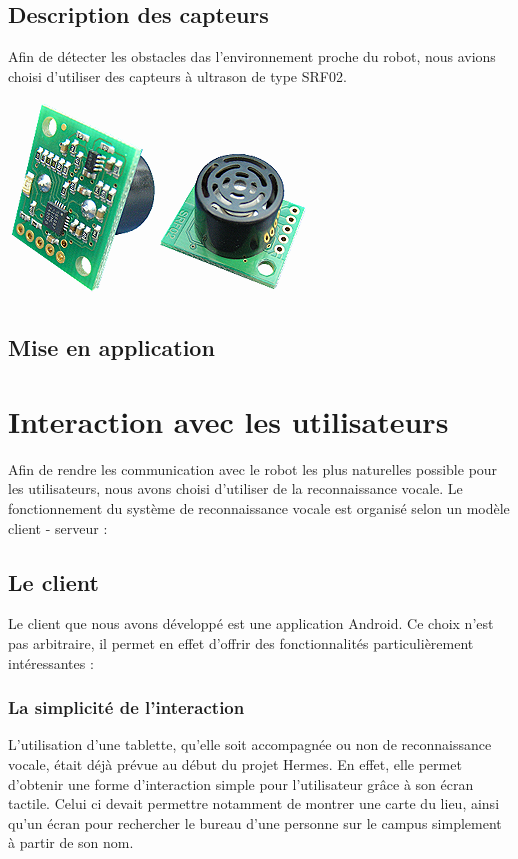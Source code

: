\documentclass{report}
\begin{document}
        \subsection{Description des capteurs}
        {Afin de détecter les obstacles das l'environnement proche du robot, nous
        avions choisi d'utiliser des capteurs à ultrason de type SRF02.}

        \begin{center}
          \includegraphics{img/srf02.png}
        \end{center}


        \subsection{Mise en application}




    \section{Interaction avec les utilisateurs}

      {Afin de rendre les communication avec le robot les plus naturelles possible
      pour les utilisateurs, nous avons choisi d'utiliser de la reconnaissance vocale.
      Le fonctionnement du système de reconnaissance vocale est organisé selon
      un modèle client - serveur :}

      \subsection{Le client}
      {Le client que nous avons développé est une application Android. Ce choix n'est
      pas arbitraire, il permet en effet d'offrir des fonctionnalités particulièrement
      intéressantes :}

        \subsubsection{La simplicité de l'interaction}
        {L'utilisation d'une tablette, qu'elle soit accompagnée ou non de reconnaissance
        vocale, était déjà prévue au début du projet Hermes. En effet, elle permet
        d'obtenir une forme d'interaction simple pour l'utilisateur grâce à son écran tactile.
        Celui ci devait permettre notamment de montrer une carte du lieu, ainsi qu'un écran
        pour rechercher le bureau d'une personne sur le campus simplement à partir de son
        nom.}
\end{document}
